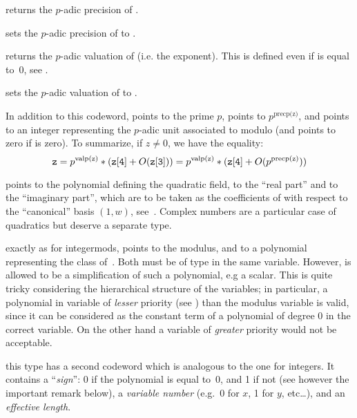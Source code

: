  returns the $p$-adic precision of .

 sets the $p$-adic precision of 
to .

 returns the $p$-adic valuation of  (i.e. the
exponent). This is defined even if  is equal to~0, see
.

 sets the $p$-adic valuation of 
to .

In addition to this codeword,  points to the prime $p$,
 points to $p^{\text{precp(z)}}$, and  points to an
integer representing the $p$-adic unit associated to  modulo
 (and points to zero if  is zero). To summarize, if $z\neq
0$, we have the equality:
$$ {\tt z} = p^{{\rm valp(z)}} * ({\tt z[4]} + O({\tt z[3]})) =
     p^{{\rm valp(z)}} * ({\tt z[4]} + O(p^{{\rm precp(z)}})) $$

  points to the polynomial defining the
quadratic field,  to the ``real part'' and  to the
``imaginary part'', which are to be taken as the coefficients of 
with respect to the ``canonical'' basis $(1,w)$, see~.
Complex numbers are a particular case of quadratics but deserve a separate
type.

 exactly as
for integermods,  points to the modulus, and  to a
polynomial representing the class of~. Both must be of type
 in the same variable. However,  is allowed to be a
simplification of such a polynomial, e.g a scalar. This is quite tricky
considering the hierarchical structure of the variables; in particular, a
polynomial in variable of \emph{lesser} priority (see )
than the modulus variable is valid, since it can be considered as the
constant term of a polynomial of degree 0 in the correct variable. On the
other hand a variable of \emph{greater} priority would not be acceptable.

 this
type has a second codeword which is analogous to the one for integers. It
contains a ``\emph{sign}'': 0 if the polynomial is equal to~0, and 1 if
not (see however the important remark below), a \emph{variable number}
(e.g.~0 for $x$, 1 for $y$, etc\dots), and an \emph{effective length}.

